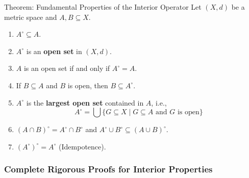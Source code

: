 \documentclass[11pt,a4paper]{article}
\begin{document}
\begin{formulabox}{Theorem: Fundamental Properties of the Interior Operator}
Let $(X, d)$ be a metric space and $A, B \subseteq X$.
\begin{enumerate}
    \item[\textbf{(i)}] $A^\circ \subseteq A$.
    \item[\textbf{(ii)}] $A^\circ$ is an \textbf{open set} in $(X, d)$.
    \item[\textbf{(iii)}] $A$ is an open set if and only if $A^\circ = A$.
    \item[\textbf{(iv)}] If $B \subseteq A$ and $B$ is open, then $B \subseteq A^\circ$.
    \item[\textbf{(v)}] $A^\circ$ is the \textbf{largest open set} contained in $A$, i.e.,
    $$A^\circ = \bigcup \{ G \subseteq X \mid G \subseteq A \text{ and } G \text{ is open} \}$$
    \item[\textbf{(vi)}] $(A \cap B)^\circ = A^\circ \cap B^\circ$ and $A^\circ \cup B^\circ \subseteq (A \cup B)^\circ$.
    \item[\textbf{(vii)}] $(A^\circ)^\circ = A^\circ$ (Idempotence).
\end{enumerate}
\end{formulabox}

\subsubsection{Complete Rigorous Proofs for Interior Properties}
\end{document}
